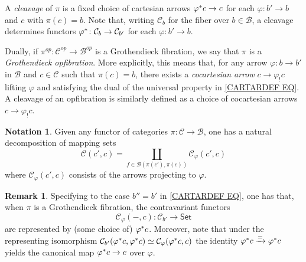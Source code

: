 \documentclass[a4paper,10pt
]{article}%
\numberwithin{equation}{section}
\numberwithin{figure}{section}
\theoremstyle{definition} %
\newtheorem{remark}[equation]{Remark}%
\newtheorem{notation}[equation]{Notation}%
\newcommand{\1}{\ensuremath{\mathbbm 1}}%
\begin{document}
A \emph{cleavage} of $\pi$ is a fixed choice of cartesian arrows
$\varphi^{\**} c \to c$
for each $\varphi \colon b' \to b$ and $c$ with $\pi(c)=b$.
%
Note that, writing $\mathcal{C}_b$ for the fiber over $b \in \mathcal{B}$, a cleavage determines functors
$\varphi^{\**} \colon \mathcal{C}_b \to \mathcal{C}_{b'}$
for each $\varphi \colon b' \to b$.


Dually, if $\pi^{op} \colon \mathcal{C}^{op} \to \mathcal{B}^{op}$
is a Grothendieck fibration,
we say that $\pi$ is a \emph{Grothendieck opfibration}.
More explicitly, this means that, for any arrow
$\varphi \colon b \to b'$ in $\mathcal{B}$
and $c \in \mathcal{C}$ such that $\pi(c) = b$,
there exists a \emph{cocartesian arrow}
$c \to \varphi_! c$ lifting $\varphi$
and satisfying the dual of the universal property in 
\eqref{CARTARDEF EQ}.
A cleavage of an opfibration is similarly defined as a 
choice of cocartesian arrows $c \to \varphi_!c$.



\begin{notation}\label{MAPSDEC NOT}
	Given any functor of categories
	$\pi \colon \mathcal{C} \to \mathcal{B}$,
	one has a natural decomposition of mapping sets
	\begin{equation}
	\mathcal{C}(c',c) = 
	\coprod_{f \in \mathcal{B}(\pi(c'),\pi(c))}
	\mathcal{C}_{\varphi}\left(c',c \right)
	\end{equation}
	where $\mathcal{C}_{\varphi}\left(c',c \right)$ consists of the arrows projecting to $\varphi$.
\end{notation}



\begin{remark}\label{CARTCHAR REM}
	Specifying to the case $b'' = b'$ in 
	\eqref{CARTARDEF EQ},
	one has that,
	when $\pi$ is a Grothendieck fibration, the contravariant functors
	\begin{equation}\label{FIXPIREP EQ}
	\mathcal{C}_{\varphi}(-,c)
	\colon
	\mathcal{C}_{b'} 
	\to
	\mathsf{Set}
	\end{equation}
	are represented by (some choice of) $\varphi^{\**}c$.
	Moreover, note that under the representing isomorphism
	$\mathcal{C}_{b'}(\varphi^{\**}c,\varphi^{\**}c)
	\simeq \mathcal{C}_{\varphi}(\varphi^{\**}c,c)$
	the identity
	$\varphi^{\**}c \xrightarrow{=} \varphi^{\**}c$
	yields the canonical map
	$\varphi^{\**}c \to c$ over $\varphi$.
\end{remark}
\end{document}
